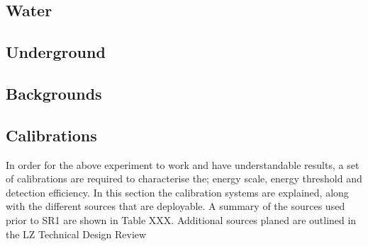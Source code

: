 \subsection{Water}

\subsection{Underground}

\subsection{Backgrounds}

\subsection{Calibrations}
\par
In order for the above experiment to work and have understandable results, a set of calibrations are required to characterise the; energy scale, energy threshold and detection efficiency.
In this section the calibration systems are explained, along with the different sources that are deployable.
A summary of the sources used prior to SR1 are shown in Table XXX. 
Additional sources planed are outlined in the LZ Technical Design Review \cite{LZ_TechnicalDesignReview_ref}

